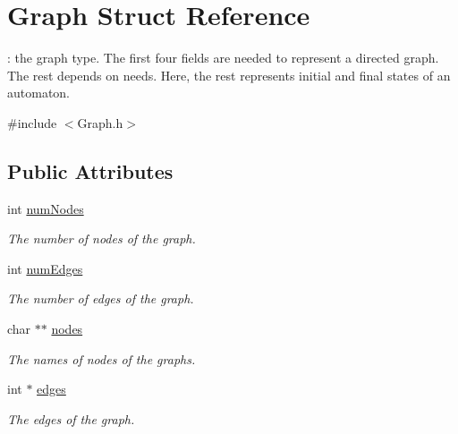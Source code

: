\hypertarget{structGraph}{}\section{Graph Struct Reference}
\label{structGraph}


\+: the graph type. The first four fields are needed to represent a directed graph. The rest depends on needs. Here, the rest represents initial and final states of an automaton.  




{\ttfamily \#include $<$Graph.\+h$>$}

\subsection*{Public Attributes}
\begin{DoxyCompactItemize}
\item 
\mbox{\label{structGraph_ad3db12d7f8327a6717fd161d694e43c0}} 
int \hyperlink{structGraph_ad3db12d7f8327a6717fd161d694e43c0}{num\+Nodes}
\begin{DoxyCompactList}\small\item\em The number of nodes of the graph. \end{DoxyCompactList}\item 
\mbox{\label{structGraph_a4f98dc06b0c1e32b27fa26efc0e11777}} 
int \hyperlink{structGraph_a4f98dc06b0c1e32b27fa26efc0e11777}{num\+Edges}
\begin{DoxyCompactList}\small\item\em The number of edges of the graph. \end{DoxyCompactList}\item 
\mbox{\label{structGraph_aa08cad811e4bd8af7d8592d215009205}} 
char $\ast$$\ast$ \hyperlink{structGraph_aa08cad811e4bd8af7d8592d215009205}{nodes}
\begin{DoxyCompactList}\small\item\em The names of nodes of the graphs. \end{DoxyCompactList}\item 
\mbox{\label{structGraph_a672e795801f3850405a178daaa98d4c0}} 
int $\ast$ \hyperlink{structGraph_a672e795801f3850405a178daaa98d4c0}{edges}
\begin{DoxyCompactList}\small\item\em The edges of the graph. \end{DoxyCompactList}\item 
$$
\end{DoxyCompactItemize}

